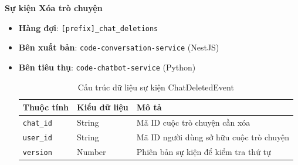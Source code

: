 \textbf{Sự kiện Xóa trò chuyện}
\begin{itemize}
\item \textbf{Hàng đợi}: \texttt{[prefix]\_chat\_deletions}
\item \textbf{Bên xuất bản}: \texttt{code-conversation-service} (NestJS)
\item \textbf{Bên tiêu thụ}: \texttt{code-chatbot-service} (Python)

\begin{table}[H]
\centering
\begin{tabular}{|l|l|l|}
\hline
\textbf{Thuộc tính} & \textbf{Kiểu dữ liệu} & \textbf{Mô tả} \\ \hline
\texttt{chat\_id} & String & Mã ID cuộc trò chuyện cần xóa \\ \hline
\texttt{user\_id} & String & Mã ID người dùng sở hữu cuộc trò chuyện \\ \hline
\texttt{version} & Number & Phiên bản sự kiện để kiểm tra thứ tự \\ \hline
\end{tabular}
\caption{Cấu trúc dữ liệu sự kiện ChatDeletedEvent}
\end{table}

\end{itemize}

